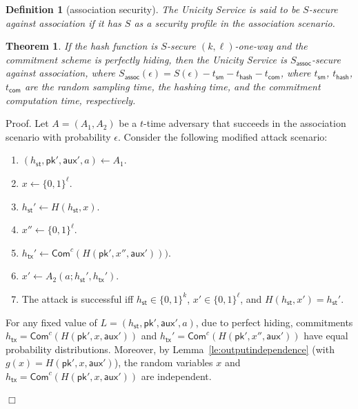 \documentclass{article}
\newtheorem{definition}{Definition}[section]
\newtheorem{theorem}{Theorem}[section]
\newenvironment{proof}{\textsf{Proof}.}{\hfill$\Box$}
\newcommand{\pubkey}[0]{\mathsf{pk}}
\newcommand{\commitc}[0]{{\mathsf{Com}^{c}}}
\newcommand{\sthash}[0]{{h_\mathsf{st}}}
\newcommand{\txhash}[0]{{h_\mathsf{tx}}}
\newcommand{\auxd}[0]{\mathsf{aux}}
\begin{document}
\begin{definition}[association security]
The Unicity Service is said to be $S$-secure against association if it has $S$ as a security profile in the association scenario.
\end{definition}


\begin{theorem}
If the hash function is $S$-secure $(k,\ell)$-one-way and the commitment scheme is perfectly hiding, then the Unicity Service is $S_\mathsf{assoc}$-secure against association, where $S_\mathsf{assoc}(\epsilon)= S(\epsilon) - t_\mathsf{sm} - t_\mathsf{hash} - t_\mathsf{com}$, where
$t_\mathsf{sm}$, $t_\mathsf{hash}$, $t_\mathsf{com}$ are the random sampling time, the hashing time, and the commitment computation time, respectively.
\end{theorem}
\begin{proof}
Let $A=(A_1,A_2)$ be a $t$-time adversary that succeeds in the association scenario with probability $\epsilon$. Consider the following modified attack scenario:
\begin{enumerate}
\item $(\sthash, \pubkey', \auxd', a)\gets A_1$.
\item $x\gets \{0,1\}^\ell$.
\item $\sthash'\gets H(\sthash,x)$.
\item $x''\gets \{0,1\}^\ell$.
\item $\txhash'\gets\commitc(H(\pubkey',x'',\auxd')))$.
\item $x'\gets A_2(a; \sthash',\txhash')$.
\item The attack is successful iff $\sthash\in\{0,1\}^k$, $x'\in\{0,1\}^\ell$, and $H(\sthash,x')=\sthash'$.
\end{enumerate}

\noindent For any fixed value of $L=(\sthash, \pubkey', \auxd', a)$, due to perfect hiding, commitments $\txhash=\commitc(H(\pubkey',x,\auxd'))$ and $\txhash'=\commitc(H(\pubkey',x'',\auxd'))$ have equal probability distributions. Moreover, by Lemma~\ref{le:outputindependence} (with $g(x)=H(\pubkey',x,\auxd')$), the random variables $x$ and $\txhash=\commitc(H(\pubkey',x,\auxd'))$ are independent.


\end{proof}
\end{document}
